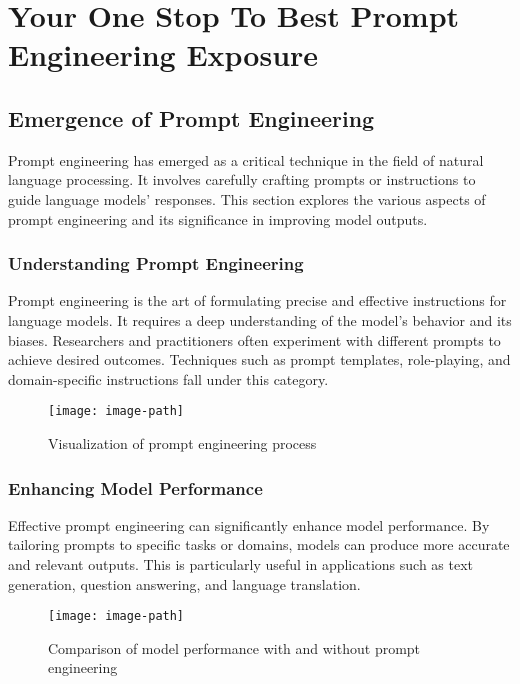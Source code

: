 \chapter{Your One Stop To Best Prompt Engineering Exposure}


\newpage

\section{Emergence of Prompt Engineering}
Prompt engineering has emerged as a critical technique in the field of natural language processing. It involves carefully crafting prompts or instructions to guide language models' responses. This section explores the various aspects of prompt engineering and its significance in improving model outputs.

\subsection{Understanding Prompt Engineering}
Prompt engineering is the art of formulating precise and effective instructions for language models. It requires a deep understanding of the model's behavior and its biases. Researchers and practitioners often experiment with different prompts to achieve desired outcomes. Techniques such as prompt templates, role-playing, and domain-specific instructions fall under this category.

\begin{figure}[hbt!]
 \centering
 \texttt{[image: image-path]}
 \caption{Visualization of prompt engineering process}
 \label{fig:prompt-engineering}
\end{figure}
\FloatBarrier

\subsection{Enhancing Model Performance}
Effective prompt engineering can significantly enhance model performance. By tailoring prompts to specific tasks or domains, models can produce more accurate and relevant outputs. This is particularly useful in applications such as text generation, question answering, and language translation.

\begin{figure}[hbt!]
 \centering
 \texttt{[image: image-path]}
 \caption{Comparison of model performance with and without prompt engineering}
 \label{fig:model-performance}
\end{figure}
\FloatBarrier

